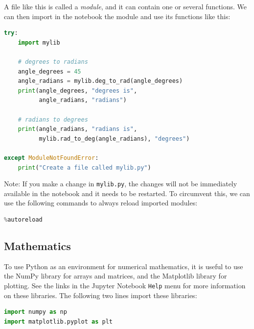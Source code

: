 \documentclass[a4paper , 12pt]{book}
\newcommand{\code}[1]{\colorbox{light-gray}{\texttt{#1}}}
\begin{document}
A file like this is called a \textit{module}, and it can contain one or several functions. We can then import in the notebook the module and use its functions like this:

\begin{center}
\begin{lstlisting}[language=Python, frame=single]
try:
    import mylib

    # degrees to radians
    angle_degrees = 45
    angle_radians = mylib.deg_to_rad(angle_degrees)
    print(angle_degrees, "degrees is", 
          angle_radians, "radians")

    # radians to degrees
    print(angle_radians, "radians is", 
          mylib.rad_to_deg(angle_radians), "degrees")
    
except ModuleNotFoundError:
    print("Create a file called mylib.py")
\end{lstlisting}
\end{center}

Note: If you make a change in \code{mylib.py}, the changes will not be immediately available in the notebook and it needs to be restarted. To circumvent this, we can use the following commands to always reload imported modules:

\begin{center}
\begin{lstlisting}[language=Python, frame=single]
%load_ext autoreload
%autoreload
\end{lstlisting}   
\end{center}

\subsection{Mathematics}

To use Python as an environment for numerical mathematics, it is useful to use the NumPy library for arrays and matrices, and the Matplotlib library for plotting. See the links in the Jupyter Notebook \code{Help} menu for more information on these libraries. The following two lines import these libraries:

\begin{center}
\begin{lstlisting}[language=Python, frame=single]
import numpy as np
import matplotlib.pyplot as plt
\end{lstlisting}
\end{center}
\end{document}
